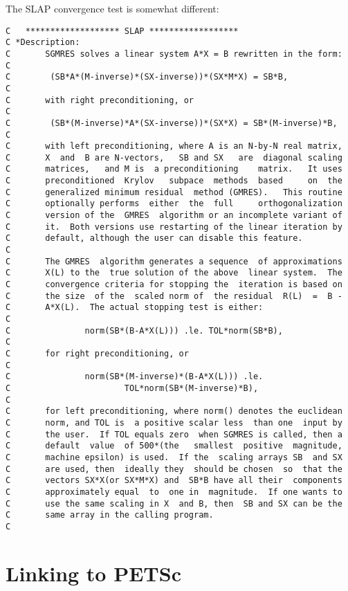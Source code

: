 \documentclass[11pt]{article}
\begin{document}
The SLAP convergence test is somewhat different:
{\footnotesize
\begin{verbatim}
C   ******************* SLAP ******************
C *Description:
C       SGMRES solves a linear system A*X = B rewritten in the form:
C
C        (SB*A*(M-inverse)*(SX-inverse))*(SX*M*X) = SB*B,
C
C       with right preconditioning, or
C
C        (SB*(M-inverse)*A*(SX-inverse))*(SX*X) = SB*(M-inverse)*B,
C
C       with left preconditioning, where A is an N-by-N real matrix,
C       X  and  B are N-vectors,   SB and SX   are  diagonal scaling
C       matrices,   and M is  a preconditioning    matrix.   It uses
C       preconditioned  Krylov   subpace  methods  based     on  the
C       generalized minimum residual  method (GMRES).   This routine
C       optionally performs  either  the  full     orthogonalization
C       version of the  GMRES  algorithm or an incomplete variant of
C       it.  Both versions use restarting of the linear iteration by
C       default, although the user can disable this feature.
C
C       The GMRES  algorithm generates a sequence  of approximations
C       X(L) to the  true solution of the above  linear system.  The
C       convergence criteria for stopping the  iteration is based on
C       the size  of the  scaled norm of  the residual  R(L)  =  B -
C       A*X(L).  The actual stopping test is either:
C
C               norm(SB*(B-A*X(L))) .le. TOL*norm(SB*B),
C
C       for right preconditioning, or
C
C               norm(SB*(M-inverse)*(B-A*X(L))) .le.
C                       TOL*norm(SB*(M-inverse)*B),
C
C       for left preconditioning, where norm() denotes the euclidean
C       norm, and TOL is  a positive scalar less  than one  input by
C       the user.  If TOL equals zero  when SGMRES is called, then a
C       default  value  of 500*(the   smallest  positive  magnitude,
C       machine epsilon) is used.  If the  scaling arrays SB  and SX
C       are used, then  ideally they  should be chosen  so  that the
C       vectors SX*X(or SX*M*X) and  SB*B have all their  components
C       approximately equal  to  one in  magnitude.  If one wants to
C       use the same scaling in X  and B, then  SB and SX can be the
C       same array in the calling program.
C
\end{verbatim}
}


% 
\vfill\eject
\section{Linking to PETSc}
\end{document}
